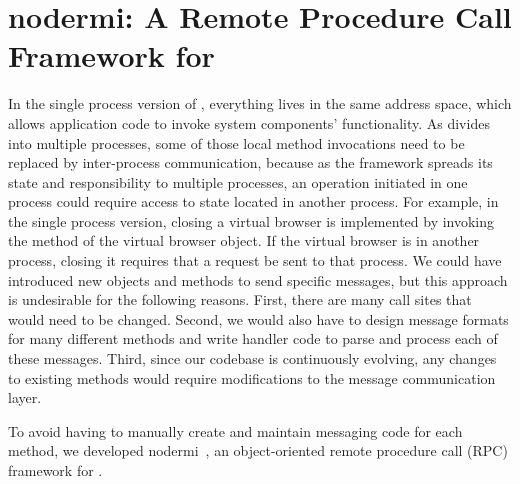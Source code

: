 \chapter{nodermi: A Remote Procedure Call Framework for \nodejs{}}
\label{ch:rmi}
In the single process version of \cb,
everything lives in the same address space,
which allows application code to invoke system components' functionality.
As \cbtwo divides \cb into multiple processes,
some of those local method invocations need to be replaced by
inter-process communication,
because as the framework spreads its state
and responsibility to multiple processes,
an operation initiated in one process
could require access to state located in another process.
For example,
in the single process version,
closing a virtual browser
is implemented by invoking the  method of the virtual browser
object.
If the virtual browser is in another process, closing it requires that a request be sent to that process.
We could have introduced new objects and methods to send specific messages,
but this approach is undesirable for the following reasons.
First, there are many call sites that would need to be changed.
Second, we would also have to design message formats for many different methods and
write handler code to parse and process each of these messages.
Third, since our codebase is continuously evolving, any changes to existing methods
would require modifications to the message communication layer.

To avoid having to manually create and maintain messaging code for each
method, we developed nodermi~\cite{nodermi}, an object-oriented
remote procedure call (RPC) framework for \nodejs{}.

